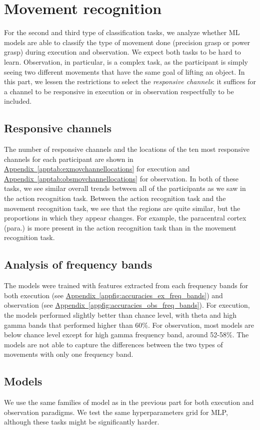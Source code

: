 \documentclass[10pt,conference,compsocconf]{IEEEtran}
\newcommand{\aref}[1]{\hyperref[#1]{Appendix~\ref*{#1}}}
\begin{document}
\section{Movement recognition}
\label{sec:objectrecognition}
For the second and third type of classification tasks, we analyze whether ML models are able to classify the type of movement done (precision grasp or power grasp) during execution and observation. We expect both tasks to be hard to learn. Observation, in particular, is a complex task, as the participant is simply seeing two different movements that have the same goal of lifting an object. In this part, we lessen the restrictions to select the \textit{responsive channels}: it suffices for a channel to be responsive in execution or in observation respectfully to be included.

\subsection{Responsive channels}
The number of responsive channels and the locations of the ten most responsive channels for each participant are shown in \aref{apptab:exmovchannellocations} for execution and \aref{apptab:obsmovchannellocations} for observation. In both of these tasks, we see similar overall trends between all of the participants as we saw in the action recognition task. Between the action recognition task and the movement recognition task, we see that the regions are quite similar, but the proportions in which they appear changes. For example, the paracentral cortex (para.)\cite{paracentral} is more present in the action recognition task than in the movement recognition task.

\subsection{Analysis of frequency bands}
The models were trained with features extracted from each frequency bands for both execution (see \aref{appfig:accuracies_ex_freq_bands}) and observation (see \aref{appfig:accuracies_obs_freq_bands}). For execution, the models performed slightly better than chance level, with theta and high gamma bands that performed higher than 60\%. For observation, most models are below chance level except for high gamma frequency band, around 52-58\%. The models are not able to capture the differences between the two types of movements with only one frequency band.

\subsection{Models}
We use the same families of model as in the previous part for both execution and observation paradigms. We test the same hyperparameters grid for MLP, although these tasks might be significantly harder.
\end{document}
